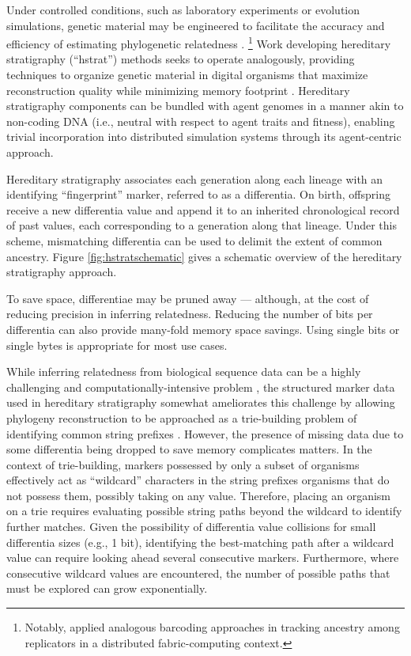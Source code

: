 Under controlled conditions, such as laboratory experiments or evolution simulations, genetic material may be engineered to facilitate the accuracy and efficiency of estimating phylogenetic relatedness \citep{li2024reconstructing}.%
\footnote{Notably, \citet{ackley2023robust} applied analogous barcoding approaches in tracking ancestry among replicators in a distributed fabric-computing context.}
Work developing hereditary stratigraphy (``hstrat'') methods seeks to operate analogously, providing techniques to organize genetic material in digital organisms that maximize reconstruction quality while minimizing memory footprint \citep{moreno2022hereditary}.
Hereditary stratigraphy components can be bundled with agent genomes in a manner akin to non-coding DNA (i.e., neutral with respect to agent traits and fitness), enabling trivial incorporation into distributed simulation systems through its agent-centric approach.

Hereditary stratigraphy associates each generation along each lineage with an identifying ``fingerprint'' marker, referred to as a differentia.
On birth, offspring receive a new differentia value and append it to an inherited chronological record of past values, each corresponding to a generation along that lineage.
Under this scheme, mismatching differentia can be used to delimit the extent of common ancestry.
Figure \ref{fig:hstratschematic} gives a schematic overview of the hereditary stratigraphy approach.

To save space, differentiae may be pruned away --- although, at the cost of reducing precision in inferring relatedness.
Reducing the number of bits per differentia can also provide many-fold memory space savings.
Using single bits or single bytes is appropriate for most use cases.

While inferring relatedness from biological sequence data can be a highly challenging and computationally-intensive problem \citep{miller2010creating},
the structured marker data used in hereditary stratigraphy somewhat ameliorates this challenge by allowing phylogeny reconstruction to be approached as a trie-building problem of identifying common string prefixes \citep{delabriandais1959file,moreno2024analysis}.
However, the presence of missing data due to some differentia being dropped to save memory complicates matters.
In the context of trie-building, markers possessed by only a subset of organisms effectively act as ``wildcard'' characters in the string prefixes organisms that do not possess them, possibly taking on any value.
Therefore, placing an organism on a trie requires evaluating possible string paths beyond the wildcard to identify further matches.
Given the possibility of differentia value collisions for small differentia sizes (e.g., 1 bit), identifying the best-matching path after a wildcard value can require looking ahead several consecutive markers.
Furthermore, where consecutive wildcard values are encountered, the number of possible paths that must be explored can grow exponentially.

